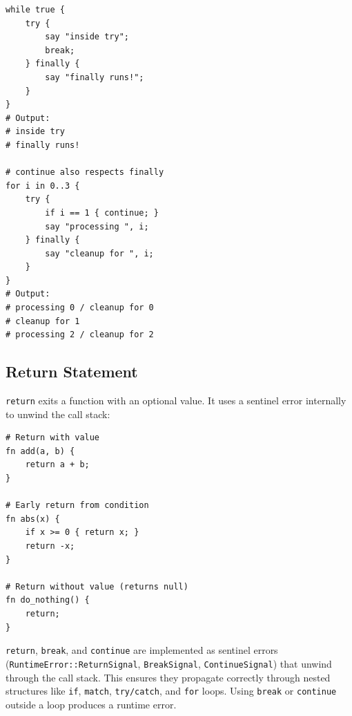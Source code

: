 \begin{tcolorbox}[colback=codebg, colframe=darkpurple, colbacktitle=darkpurple, title=\textbf{\textcolor{codegold}{Break with Finally}}, fonttitle=\bfseries, sharp corners]
\begin{lstlisting}
while true {
    try {
        say "inside try";
        break;
    } finally {
        say "finally runs!";
    }
}
# Output:
# inside try
# finally runs!

# continue also respects finally
for i in 0..3 {
    try {
        if i == 1 { continue; }
        say "processing ", i;
    } finally {
        say "cleanup for ", i;
    }
}
# Output:
# processing 0 / cleanup for 0
# cleanup for 1
# processing 2 / cleanup for 2
\end{lstlisting}
\end{tcolorbox}

\subsection{Return Statement}

\texttt{return} exits a function with an optional value. It uses a sentinel error internally to unwind the call stack:

\begin{tcolorbox}[colback=codebg, colframe=darkpurple, colbacktitle=darkpurple, title=\textbf{\textcolor{codegold}{Return Statement}}, fonttitle=\bfseries, sharp corners]
\begin{lstlisting}
# Return with value
fn add(a, b) {
    return a + b;
}

# Early return from condition
fn abs(x) {
    if x >= 0 { return x; }
    return -x;
}

# Return without value (returns null)
fn do_nothing() {
    return;
}
\end{lstlisting}
\end{tcolorbox}

\begin{tcolorbox}[colback=lightlavender, colframe=softvioletdark, title=\textbf{\textcolor{darkpurple}{Design Note: Control Flow Signals}}, fonttitle=\bfseries, sharp corners]
\texttt{return}, \texttt{break}, and \texttt{continue} are implemented as sentinel errors (\texttt{RuntimeError::ReturnSignal}, \texttt{BreakSignal}, \texttt{ContinueSignal}) that unwind through the call stack. This ensures they propagate correctly through nested structures like \texttt{if}, \texttt{match}, \texttt{try/catch}, and \texttt{for} loops. Using \texttt{break} or \texttt{continue} outside a loop produces a runtime error.
\end{tcolorbox}
